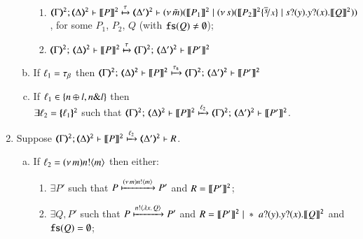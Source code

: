 \begin{enumerate}[1.]
\begin{enumerate}[a)]
\begin{enumerate}[-]
					\item	%
						$
						\horel{\tmap{\Gamma}{2}}{\tmap{\Delta}{2}}{\pmap{P}{2}}
						{\hby{\tau}}
						{\tmap{\Delta'}{2}}{}{\newsp{\tilde{m}}{\pmap{P_1}{2} \Par \newsp{s}
						{\pmap{P_2}{2}\subst{\dual{s}}{x} \Par \binp{s}{y} \binp{y}{x} \pmap{Q}{2}}}}
						$, for some $P_1$, $P_2$, $Q$ (with { $\mathtt{fs}(Q) \neq \emptyset$});

					\item	%
						$\tmap{\Gamma}{2};\, \tmap{\Delta}{2} \proves \pmap{P}{2}
						\hby{\tau}
						\tmap{\Gamma}{2};\, \tmap{\Delta'}{2} \proves \pmap{P'}{2}$


				\end{enumerate}
				
				\item	If $\ell_1 = \tau_{\beta}$ then
						$\tmap{\Gamma}{2};\, \tmap{\Delta}{2} \proves \pmap{P}{2}
						\hby{\stau}
						\tmap{\Gamma}{2};\, \tmap{\Delta'}{2} \proves \pmap{P'}{2}$

 

			\item	 
				If  
				$\ell_1 \in \{n \oplus l, n \& l\}$
				 then \\
				$\exists \ell_2 = \{\!\!\{\ell_1\}\!\!\}^{\mathtt{2}}$ such that 
				$\tmap{\Gamma}{2};\,\tmap{\Delta}{2} \proves  \pmap{P}{2}
				\hby{\ell_2}
				\tmap{\Gamma}{2};\,\tmap{\Delta'}{2} \proves  \pmap{P'}{2}$.			
		\end{enumerate}
		
		\item Suppose 
		$\stytra{\tmap{\Gamma}{2}}{\ell_2}{\tmap{\Delta}{2}}{\pmap{P}{2}}{\tmap{\Delta'}{2}}{R}$.
			\begin{enumerate}[a)]
				\item %
					If  
					$\ell_2 = (\nu\, m)n ! \langle m \rangle$
					then 
					either:
					\begin{enumerate}[-]
					\item	$\exists P'$ such that $P \xmapsto{(\nu\, m) n !\langle m \rangle} P'$
						and $R = \llbracket P'\rrbracket^\mathtt{2}$;

					\item	$\exists Q, P'$ such that $P \xmapsto{n !\langle \lambda x.\,Q \rangle} P'$
						and $R = \llbracket P'\rrbracket^\mathtt{2} \;|\; \ast\; a ? (y) . y ? (x) . \llbracket Q\rrbracket^\mathtt{2}$
						and {$\mathtt{fs}(Q) = \emptyset$};


\end{enumerate}
\end{enumerate}
\end{enumerate}
